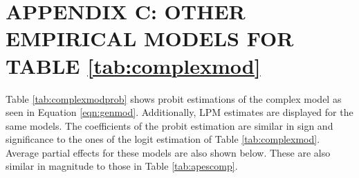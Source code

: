 \documentclass[12pt,a4]{article}\usepackage[]{graphicx}\usepackage[]{xcolor}
\begin{document}



\section{APPENDIX C: OTHER EMPIRICAL MODELS FOR TABLE \ref{tab:complexmod}}
\label{app:third}

Table \ref{tab:complexmodprob} shows probit estimations of the complex model as seen in Equation \ref{eqn:genmod}. Additionally, LPM estimates are displayed for the same models. The coefficients of the probit estimation are similar in sign and significance to the ones of the logit estimation of Table \ref{tab:complexmod}. Average partial effects for these models are also shown below. These are also similar in magnitude to those in Table \ref{tab:apescomp}. 
\end{document}
